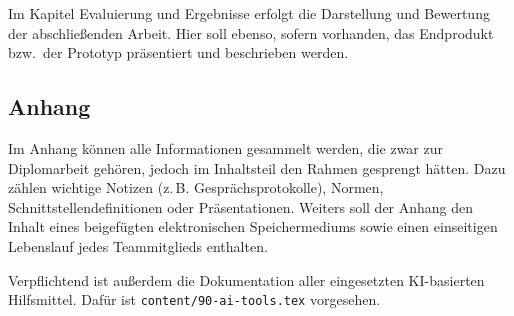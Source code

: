 Im Kapitel Evaluierung und Ergebnisse erfolgt die Darstellung und Bewertung
der abschließenden Arbeit. Hier soll ebenso, sofern vorhanden, das
Endprodukt bzw.\ der Prototyp präsentiert und beschrieben werden.

\subsection{Anhang}

Im Anhang können alle Informationen gesammelt werden, die zwar zur
Diplomarbeit gehören, jedoch im Inhaltsteil den Rahmen gesprengt hätten.
Dazu zählen wichtige Notizen (z.\,B. Gesprächsprotokolle), Normen,
Schnittstellendefinitionen oder Präsentationen. Weiters soll der Anhang den
Inhalt eines beigefügten elektronischen Speichermediums sowie einen
einseitigen Lebenslauf jedes Teammitglieds enthalten.

Verpflichtend ist außerdem die Dokumentation aller eingesetzten KI-basierten
Hilfsmittel. Dafür ist \lstinline|content/90-ai-tools.tex| vorgesehen.
